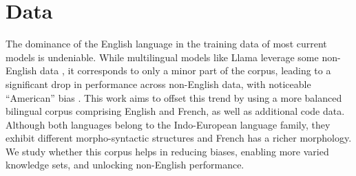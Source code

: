 

\section{Data}
The dominance of the English language in the training data of most current models is undeniable. While multilingual models like Llama leverage some non-English data \cite{touvron2023llama}, it corresponds to only a minor part of the corpus, leading to a significant drop in performance across non-English data, with noticeable ``American'' bias .
This work aims to offset this trend by using a more balanced bilingual corpus comprising English and French, as well as additional code data.
Although both languages belong to the Indo-European language family, they exhibit different morpho-syntactic structures and French has a richer morphology. We study whether this corpus helps in reducing biases, enabling more varied knowledge sets, and unlocking non-English performance.


